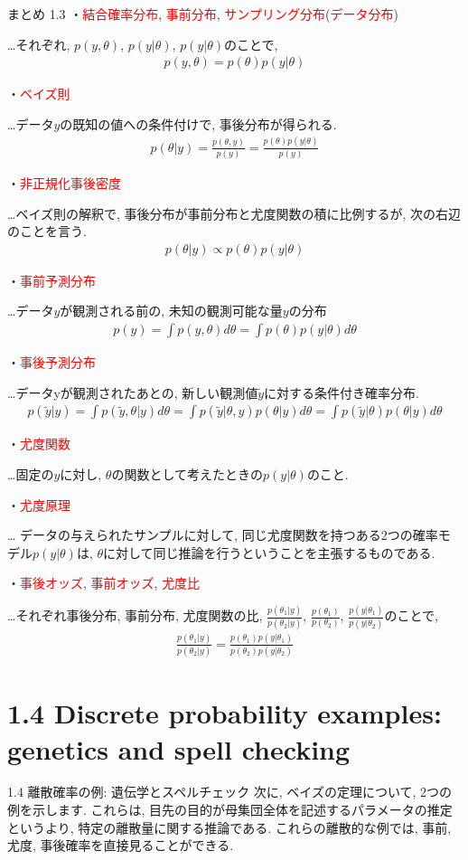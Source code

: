 \documentclass[10pt,dvipdfmx,a4]{beamer}
\newcommand{\eqn}[1]{\begin{align*}#1\end{align*}}
\newcommand{\tcr}[1]{\textcolor{red}{#1}}
\begin{document}

\begin{frame}{まとめ 1.3}
・\tcr{結合確率分布}, \tcr{事前分布}, \tcr{サンプリング分布}(\tcr{データ分布})

…それぞれ, $p(y,\theta)$, $p(y|\theta)$, $p(y|\theta)$のことで,
\eqn{p(y,\theta)=p(\theta)p(y|\theta)}

・\tcr{ベイズ則}

…データ$y$の既知の値への条件付けで, 事後分布が得られる.
\eqn{p(\theta|y)=\tfrac{p(\theta,y)}{p(y)}=\tfrac{p(\theta)p(y|\theta)}{p(y)}}

・\tcr{非正規化事後密度}

…ベイズ則の解釈で, 事後分布が事前分布と尤度関数の積に比例するが, 次の右辺のことを言う.
\eqn{p(\theta|y)\propto p(\theta)p(y|\theta)}

・\tcr{事前予測分布}

…データ$y$が観測される前の, 未知の観測可能な量$y$の分布
\eqn{p(y)=\int p(y,\theta)d\theta=\int p(\theta)p(y|\theta)d\theta}
\end{frame}


\begin{frame}
・\tcr{事後予測分布}

…データyが観測されたあとの, 新しい観測値$\tilde{y}$に対する条件付き確率分布.
\eqn{p(\tilde{y}|y)=\int p(\tilde{y},\theta|y)d\theta=\int p(\tilde{y}|\theta,y)p(\theta|y)d\theta=\int p(\tilde{y}|\theta)p(\theta|y)d\theta}

・\tcr{尤度関数}

…固定の$y$に対し, $\theta$の関数として考えたときの$p(y|\theta)$のこと.

・\tcr{尤度原理}

… データの与えられたサンプルに対して, 同じ尤度関数を持つある2つの確率モデル$p(y|\theta)$は, $\theta$に対して同じ推論を行うということを主張するものである.

・\tcr{事後オッズ}, \tcr{事前オッズ}, \tcr{尤度比}

…それぞれ事後分布, 事前分布, 尤度関数の比, $\tfrac{p(\theta_1|y)}{p(\theta_2|y)}$, $\tfrac{p(\theta_1)}{p(\theta_2)}$, $\tfrac{p(y|\theta_1)}{p(y|\theta_2)}$のことで,
\eqn{\tfrac{p(\theta_1|y)}{p(\theta_2|y)}=\tfrac{p(\theta_1)p(y|\theta_1)}{p(\theta_2)p(y|\theta_2)}}
\end{frame}

\section{1.4 Discrete probability examples: genetics and spell checking}
\begin{frame}{1.4 離散確率の例: 遺伝学とスペルチェック}
次に, ベイズの定理について, 2つの例を示します.
これらは, 目先の目的が母集団全体を記述するパラメータの推定というより, 特定の離散量に関する推論である.
これらの離散的な例では, 事前, 尤度, 事後確率を直接見ることができる.
\end{frame}
\end{document}
